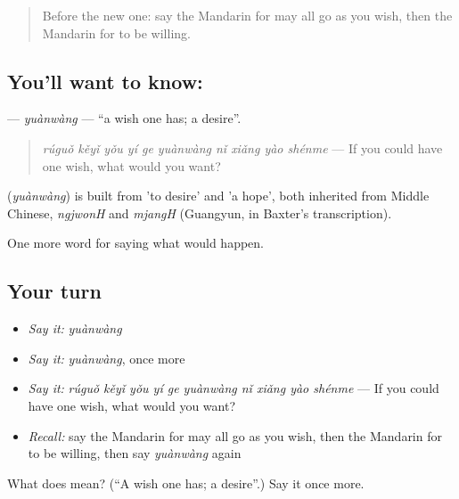 \label{lesson:ZH-C535-yuanwang}



\begin{quote}
Before the new one: say the Mandarin for may all go as you wish, then the Mandarin for to be willing.
\end{quote}

\subsection*{You'll want to know: }
\textbf{} — \emph{yuànwàng} — \textquotedblleft{}a wish one has; a desire\textquotedblright{}.

\begin{quote}
\textbf{} \emph{rúguǒ kěyǐ yǒu yí ge yuànwàng nǐ xiǎng yào shénme} — If you could have one wish, what would you want?
\end{quote}

\begin{cousinweb}
\textbf{} (\emph{yuànwàng}) is built from  'to desire' and  'a hope', both inherited from Middle Chinese, \emph{ngjwonH} and \emph{mjangH} (Guangyun, in Baxter's transcription).
\end{cousinweb}

\begin{grammarlens}[title={What you've built}]
One more word for saying what would happen.
\end{grammarlens}

\subsection*{Your turn}
\begin{itemize}
\raggedright
  \item \emph{Say it:} \emph{yuànwàng}
  \item \emph{Say it:} \emph{yuànwàng}, once more
  \item \emph{Say it:} \emph{rúguǒ kěyǐ yǒu yí ge yuànwàng nǐ xiǎng yào shénme} — If you could have one wish, what would you want?
  \item \emph{Recall:} say the Mandarin for may all go as you wish, then the Mandarin for to be willing, then say \emph{yuànwàng} again
\end{itemize}

\begin{tcolorbox}[breakable,colback=teal!4,colframe=teal!35!black,title={Before you move on}]
What does  mean? (\textquotedblleft{}A wish one has; a desire\textquotedblright{}.) Say it once more.
\end{tcolorbox}
